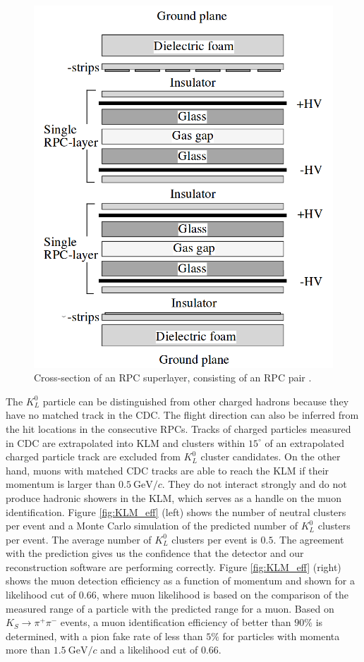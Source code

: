 \documentclass[headings=standardclasses,headings=big,oneside,a4paper,openany,12pt]{scrbook}
\newcommand {\e}[1]{\mathrm{~#1}}
\begin{document}
\begin{figure}[H]
	\centering
	\captionsetup{width=0.8\linewidth}
	\includegraphics[width=0.4\linewidth]{fig/setup/KLM_layer}
	\caption{Cross-section of an RPC superlayer, consisting of an RPC pair \cite{ABASHIAN2002117}.}
	\label{fig:KLM_layer}
\end{figure}

The $K_L^0$ particle can be distinguished from other charged hadrons because they have no matched track in the CDC. The flight direction can also be inferred from the hit locations in the consecutive RPCs. Tracks of charged particles measured in CDC are extrapolated into KLM and clusters within $15^\circ$ of an extrapolated charged particle track are excluded from $K_L^0$ cluster candidates. On the other hand, muons with matched CDC tracks are able to reach the KLM if their momentum is larger than $0.5\e{GeV}/c$. They do not interact strongly and do not produce hadronic showers in the KLM, which serves as a handle on the muon identification. Figure \ref{fig:KLM_eff} (left) shows the number of neutral clusters per event and a Monte Carlo simulation of the predicted number of $K_L^0$ clusters per event. The average number of $K_L^0$ clusters per event is $0.5$. The agreement with the prediction gives us the confidence that the detector and our reconstruction software are performing correctly. Figure \ref{fig:KLM_eff} (right) shows the muon detection efficiency as a function of  momentum and shown for a likelihood cut of $0.66$, where muon likelihood is based on the comparison of the measured range of a particle with the predicted range for a muon. Based on $K_S \to \pi^+\pi^-$ events, a muon identification efficiency of better than $90\%$ is determined,  with a pion fake rate of less than $5\%$ for particles with momenta more than $1.5\e{GeV}/c$ and a likelihood cut of $0.66$.
\end{document}
